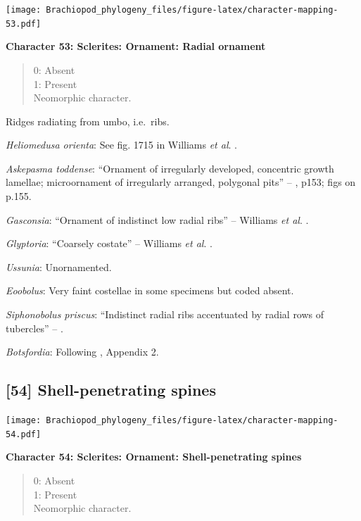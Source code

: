 \documentclass[]{book}
\theoremstyle{definition}
\theoremstyle{definition}
\theoremstyle{definition}
\theoremstyle{remark}
\begin{document}
\texttt{[image: Brachiopod\_phylogeny\_files/figure-latex/character-mapping-53.pdf]}

\textbf{Character 53: Sclerites: Ornament: Radial ornament}

\begin{quote}
0: Absent\\
1: Present\\
Neomorphic character.
\end{quote}

Ridges radiating from umbo, i.e.~ribs.

\emph{Heliomedusa orienta}: See fig. 1715 in Williams \emph{et al}.
\citeyearpar{Williams2007PartH}.

\emph{Askepasma toddense}: ``Ornament of irregularly developed,
concentric growth lamellae; microornament of irregularly arranged,
polygonal pits'' -- \citet{Williams2000BrachiopodaLinguliformea}, p153;
figs on p.155.

\emph{Gasconsia}: ``Ornament of indistinct low radial ribs'' -- Williams
\emph{et al}. \citeyearpar[p167]{Williams2000BrachiopodaLinguliformea}.

\emph{Glyptoria}: ``Coarsely costate'' -- Williams \emph{et al}.
\citeyearpar[p710]{Williams2000BrachiopodaLinguliformea}.

\emph{Ussunia}: Unornamented.

\emph{Eoobolus}: Very faint costellae in some specimens but coded
absent.

\emph{Siphonobolus priscus}: ``Indistinct radial ribs accentuated by
radial rows of tubercles'' -- \citet{Popov2009Earlyontogeny}.

\emph{Botsfordia}: Following \citet{Williams1998Thediversity}, Appendix
2.

\hypertarget{shell-penetrating-spines}{%
\subsection*{{[}54{]} Shell-penetrating
spines}\label{shell-penetrating-spines}}

\texttt{[image: Brachiopod\_phylogeny\_files/figure-latex/character-mapping-54.pdf]}

\textbf{Character 54: Sclerites: Ornament: Shell-penetrating spines}

\begin{quote}
0: Absent\\
1: Present\\
Neomorphic character.
\end{quote}
\end{document}
